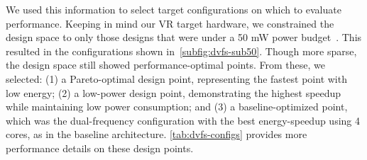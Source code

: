 We used this information to select target configurations on which to evaluate \nameArch performance.
Keeping in mind our VR target hardware, we constrained the design space to only those designs that were under a 50 mW power budget~\cite{tikekar18ijssc}.
This resulted in the configurations shown in~\ref{subfig:dvfs-sub50}.
Though more sparse, the design space still showed performance-optimal points.
From these, we selected: (1) a Pareto-optimal design point, representing the fastest point with low energy; (2) a low-power design point, demonstrating the highest speedup while maintaining low power consumption; and (3) a baseline-optimized point, which was the dual-frequency configuration with the best energy-speedup using 4 cores, as in the baseline architecture.
\ref{tab:dvfs-configs} provides more performance details on these design points.

\dvfsConfigTable

